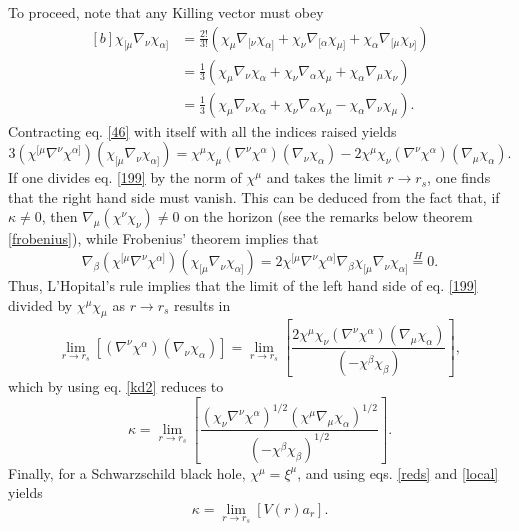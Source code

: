 \documentclass[
12pt,		%
openright,	%
twoside,  %
a4paper,			%
chapter=TITLE,		%
english,			%
french,				%
spanish,			%
brazil				%
]{USPSC-classe/USPSC}
\begin{document}
To proceed, note that any Killing vector must obey 
\begin{equation}\label{46}
\begin{aligned}[b]
    \chi_{[\mu}\nabla_{\nu}\chi_{\alpha]}&=\frac{2!}{3!}(\chi_{\mu}\nabla_{[\nu}\chi_{\alpha]}+\chi_{\nu}\nabla_{[\alpha}\chi_{\mu]}+\chi_{\alpha}\nabla_{[\mu}\chi_{\nu]})\\
    &=\frac{1}{3}(\chi_{\mu}\nabla_{\nu}\chi_{\alpha}+\chi_{\nu}\nabla_{\alpha}\chi_{\mu}+\chi_{\alpha}\nabla_{\mu}\chi_{\nu})\\
    &=\frac{1}{3}(\chi_{\mu}\nabla_{\nu}\chi_{\alpha}+\chi_{\nu}\nabla_{\alpha}\chi_{\mu}-\chi_{\alpha}\nabla_{\nu}\chi_{\mu}).
    \end{aligned}
\end{equation}
Contracting eq. \ref{46} with itself with all the indices raised yields
\begin{equation}\label{199}
    3(\chi^{[\mu}\nabla^{\nu}\chi^{\alpha]})(\chi_{[\mu}\nabla_{\nu}\chi_{\alpha]})=\chi^{\mu}\chi_{\mu}(\nabla^{\nu}\chi^{\alpha})(\nabla_{\nu}\chi_{\alpha})-2\chi^{\mu}\chi_{\nu}(\nabla^{\nu}\chi^{\alpha})(\nabla_{\mu}\chi_{\alpha}).
\end{equation}
If one divides eq. \ref{199} by the norm of $\chi^{\mu}$ and takes the limit $r\to r_s$, one finds that the right hand side must vanish. This can be deduced from the fact that, if $\kappa\neq0$, then $\nabla_{\mu}(\chi^{\nu}\chi_{\nu})\neq 0$ on the horizon (see the remarks below theorem \ref{frobenius}), while Frobenius' theorem implies that 
\begin{equation}
    \nabla_{\beta}(\chi^{[\mu}\nabla^{\nu}\chi^{\alpha]})(\chi_{[\mu}\nabla_{\nu}\chi_{\alpha]})=2\chi^{[\mu}\nabla^{\nu}\chi^{\alpha]}\nabla_{\beta}\chi_{[\mu}\nabla_{\nu}\chi_{\alpha]}\overset{H}{=}0.
\end{equation}
Thus, L'Hopital's rule \cite{Stewart2007} implies that the limit of the left hand side of eq. \ref{199} divided by $\chi^{\mu}\chi_{\mu}$ as $r\to r_s$ results in
\begin{equation}
\lim_{r\to r_s}{\left[(\nabla^{\nu}\chi^{\alpha})(\nabla_{\nu}\chi_{\alpha})\right]}=\lim_{r\to r_s}{\left[\frac{2\chi^{\mu}\chi_{\nu}(\nabla^{\nu}\chi^{\alpha})(\nabla_{\mu}\chi_{\alpha})}{(-\chi^{\beta}\chi_{\beta})}\right]},
\end{equation}
which by using eq. \ref{kd2} reduces to
\begin{equation}
    \kappa=\lim_{r\to r_s}{\left[\frac{(\chi_{\nu}\nabla^{\nu}\chi^{\alpha})^{1/2}(\chi^{\mu}\nabla_{\mu}\chi_{\alpha})^{1/2}}{(-\chi^{\beta}\chi_{\beta})^{1/2}}\right]}.
\end{equation}
Finally, for a Schwarzschild black hole, $\chi^{\mu}=\xi^{\mu}$, and using eqs. \ref{reds} and \ref{local} yields
\begin{equation}
    \kappa=\lim_{r\to r_s}{[V(r)a_r]}.
\end{equation}
\end{document}
